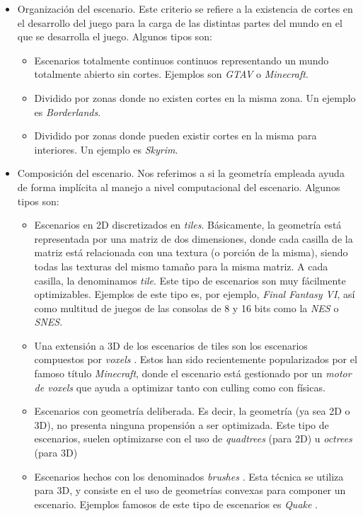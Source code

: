 \begin{itemize}
	\item Organización del escenario. Este criterio se refiere a la existencia de cortes en el desarrollo del juego para la carga de las distintas partes del mundo en el que se desarrolla el juego. Algunos tipos son:
	\begin{itemize}
		\item Escenarios totalmente continuos continuos representando un mundo totalmente abierto sin cortes. Ejemplos son \emph{GTAV} o \emph{Minecraft}.
		\item Dividido por zonas donde no existen cortes en la misma zona. Un ejemplo es \emph{Borderlands}.
		\item Dividido por zonas donde pueden existir cortes en la misma para interiores. Un ejemplo es \emph{Skyrim}.
	\end{itemize}
	\item Composición del escenario. Nos referimos a si la geometría empleada ayuda de forma implícita al manejo a nivel computacional del escenario. Algunos tipos son:
	\begin{itemize}
			 \label{maptiles-r}
		\item Escenarios en 2D discretizados en \emph{tiles}. Básicamente, la geometría está representada por una matriz de dos dimensiones, donde cada casilla de la matriz está relacionada con una textura (o porción de la misma), siendo todas las texturas del mismo tamaño para la misma matriz. A cada casilla, la denominamos \emph{tile}. Este tipo de escenarios son muy fácilmente optimizables. Ejemplos de este tipo es, por ejemplo, \emph{Final Fantasy VI}, así como multitud de juegos de las consolas de 8 y 16 bits como la \emph{NES} o \emph{SNES}.
		\item Una extensión a 3D de los escenarios de tiles son los escenarios compuestos por \emph{voxels} \cite{voxel}. Estos han sido recientemente popularizados por el famoso título \emph{Minecraft}, donde el escenario está gestionado por un \emph{motor de voxels} que ayuda a optimizar tanto con culling como con físicas.
		\item Escenarios con geometría deliberada. Es decir, la geometría (ya sea 2D o 3D), no presenta ninguna propensión a ser optimizada. Este tipo de escenarios, suelen optimizarse con el uso de \emph{quadtrees} \cite{quadtree} (para 2D) u \emph{octrees} \cite{octree} (para 3D)
		\item Escenarios hechos con los denominados \emph{brushes} \cite{brush}. Esta técnica se utiliza para 3D, y consiste en el uso de geometrías convexas para componer un escenario. Ejemplos famosos de este tipo de escenarios es \emph{Quake} \cite{quake}.
	\end{itemize}
\end{itemize}

